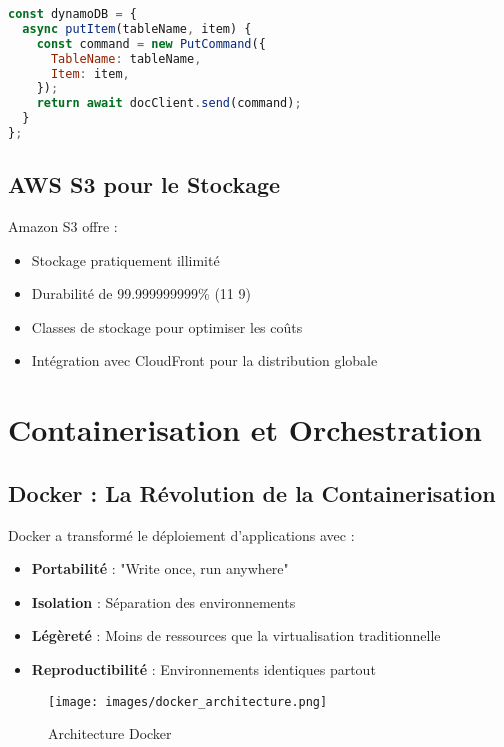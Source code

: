 \begin{lstlisting}[language=JavaScript, caption=Exemple d'opération DynamoDB]
const dynamoDB = {
  async putItem(tableName, item) {
    const command = new PutCommand({
      TableName: tableName,
      Item: item,
    });
    return await docClient.send(command);
  }
};
\end{lstlisting}

\subsection{AWS S3 pour le Stockage}

Amazon S3 offre :
\begin{itemize}
    \item Stockage pratiquement illimité
    \item Durabilité de 99.999999999\% (11 9)
    \item Classes de stockage pour optimiser les coûts
    \item Intégration avec CloudFront pour la distribution globale
\end{itemize}

\section{Containerisation et Orchestration}

\subsection{Docker : La Révolution de la Containerisation}

Docker a transformé le déploiement d'applications avec :
\begin{itemize}
    \item \textbf{Portabilité} : "Write once, run anywhere"
    \item \textbf{Isolation} : Séparation des environnements
    \item \textbf{Légèreté} : Moins de ressources que la virtualisation traditionnelle
    \item \textbf{Reproductibilité} : Environnements identiques partout
\end{itemize}

\begin{figure}[H]
    \centering
    \texttt{[image: images/docker\_architecture.png]}
    \caption{Architecture Docker}
    \label{fig:docker_architecture}
\end{figure}

